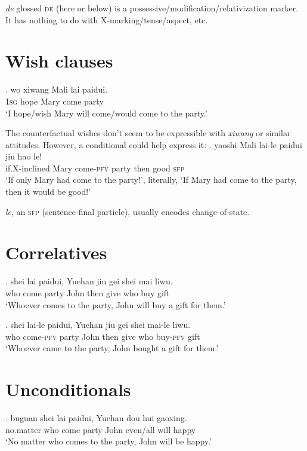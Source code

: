 \documentclass[11pt]{article}
\begin{document}
\emph{de} glossed \textsc{de} (here or below) is a possessive/modification/relativization marker. 
It has nothing to do with X-marking/tense/aspect, etc.

\section{Wish clauses}
\label{sec:wish_clauses}

\ex. \gll 
wo xiwang Mali lai paidui. \\
\textsc{1sg} hope Mary come party \\
\glt `I hope/wish Mary will come/would come to the party.'


The counterfactual wishes don't seem to be expressible with \emph{xiwang} or similar attitudes.
However, a conditional could help express it:
\ex. \gll 
yaoshi Mali lai-le paidui jiu hao le!\\
if.X-inclined Mary come-\textsc{pfv} party then good \textsc{sfp}  \\
\glt `If only Mary had come to the party!', literally, `If Mary had come to the party, then it would be good!'

\emph{le}, an \textsc{sfp} (sentence-final particle), usually encodes change-of-state.

\section{Correlatives}
\label{sec:correlatives}

\ex. \gll 
shei lai paidui, Yuehan jiu gei shei mai liwu. \\
who come party John then give who buy gift \\
\glt `Whoever comes to the party, John will buy a gift for them.'



\ex. \gll 
shei lai-le paidui, Yuehan jiu gei shei mai-le liwu. \\
who come-\textsc{pfv} party John then give who buy-\textsc{pfv} gift \\
\glt `Whoever came to the party, John bought a gift for them.'

\section{Unconditionals}
\label{sec:unconditionals}

\ex. \gll 
buguan shei lai paidui, Yuehan dou hui gaoxing. \\
no.matter who come party John even/all will happy \\
\glt `No matter who comes to the party, John will be happy.'
\end{document}
